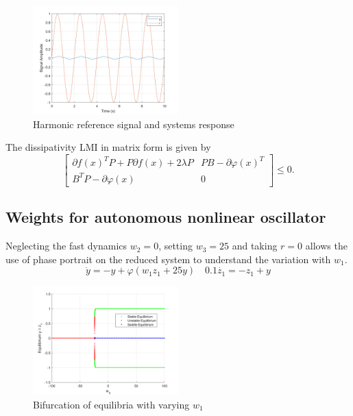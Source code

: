 \documentclass{article}
\begin{document}
\begin{figure}[H]
    \centering
    \includegraphics[width=0.5\textwidth]{figures/11_harmonic_reference.png}
    \caption{Harmonic reference signal and systems response}
    \label{fig:11_harmonic}
\end{figure}

The dissipativity LMI in matrix form is given by
\begin{equation}    
\left[
\begin{array}{cc}
\partial f(x)^T P + P \partial f(x) + 2\lambda P & PB - \partial \varphi(x)^T \\
B^T P - \partial \varphi(x) & 0
\end{array}
\right] \leq 0.
\end{equation}

\subsection{Weights for autonomous nonlinear oscillator}
Neglecting the fast dynamics $w_2 = 0$, setting $w_3 = 25$ and taking $r = 0$ allows the
use of phase portrait on the reduced system to understand the variation with $w_1$.
\begin{equation}
    \dot{y} = -y + \varphi(w_1z_1 + 25y) \quad 0.1 \dot{z_1} = -z_1 + y
\end{equation}

\begin{figure}[H]
    \centering
    \includegraphics[width=0.5\textwidth]{figures/equilibria_bifurcation.png}
    \caption{Bifurcation of equilibria with varying $w_1$}
    \label{fig:equilibria}
\end{figure}
\end{document}
